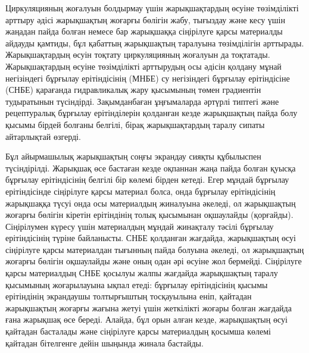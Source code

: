 \begin{multicols}{2}
Циркуляцияның жоғалуын болдырмау үшін жарықшақтардың өсуіне төзімділікті
арттыру әдісі жарықшақтың жоғарғы бөлігін жабу, тығыздау және кесу үшін
жаңадан пайда болған немесе бар жарықшаққа сіңірілуге қарсы материалды
айдауды қамтиды, бұл қабаттың жарықшақтың таралуына төзімділігін
арттырады. Жарықшақтардың өсуін тоқтату циркуляцияның жоғалуын да
тоқтатады. Жарықшақтардың өсуіне төзімділікті арттырудың осы әдісін
қолдану мұнай негізіндегі бұрғылау ерітіндісінің (МНБЕ) су негізіндегі
бұрғылау ерітіндісіне (СНБЕ) қарағанда гидравликалық жару қысымының
төмен градиентін тудыратынын түсіндірді. Зақымданбаған ұңғымаларда
әртүрлі типтегі және рецептуралық бұрғылау ерітінділерін қолданған кезде
жарықшақтың пайда болу қысымы бірдей болғаны белгілі, бірақ
жарықшақтардың таралу сипаты айтарлықтай өзгерді.

Бұл айырмашылық жарықшақтың соңғы экрандау сияқты құбылыспен
түсіндірілді. Жарықшақ өсе бастаған кезде оқпаннан жаңа пайда болған
қуысқа бұрғылау ерітіндісінің белгілі бір көлемі бірден кетеді. Егер
мұндай бұрғылау ерітіндісінде сіңірілуге қарсы материал болса, онда
бұрғылау ерітіндісінің жарықшаққа түсуі онда осы материалдың жиналуына
әкеледі, ол жарықшақтың жоғарғы бөлігін кіретін ерітіндінің толық
қысымынан оқшаулайды (қорғайды). Сіңірілумен күресу үшін материалдың
мұндай жинақталу тәсілі бұрғылау ерітіндісінің түріне байланысты. СНБЕ
қолданған жағдайда, жарықшақтың өсуі сіңірілуге қарсы материалдан
тығынның пайда болуына әкеледі, ол жарықшақтың жоғарғы бөлігін
оқшаулайды және оның одан әрі өсуіне жол бермейді. Сіңірілуге қарсы
материалдың СНБЕ қосылуы жалпы жағдайда жарықшақтың таралу қысымының
жоғарылауына ықпал етеді: бұрғылау ерітіндісінің қысымы ерітіндінің
экрандаушы толтырғыштың тосқауылына еніп, қайтадан жарықшақтың жоғарғы
жағына жетуі үшін жеткілікті жоғары болған жағдайда ғана жарықшақ өсе
береді. Алайда, бұл орын алған кезде, жарықшақтың өсуі қайтадан
басталады және сіңірілуге қарсы материалдың қосымша көлемі қайтадан
бітелгенге дейін шыңында жинала бастайды.


\end{multicols}
